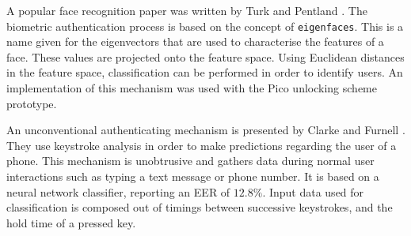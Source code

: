 A popular face recognition paper was written by Turk and Pentland \cite{turk1991face}. The biometric authentication process is based on the concept of {\tt eigenfaces}. This is a name given for the eigenvectors that are used to characterise the features of a face. These values are projected onto the feature space. Using Euclidean distances in the feature space, classification can be performed in order to identify users. An implementation of this mechanism was used with the Pico unlocking scheme prototype.

An unconventional authenticating mechanism is presented by Clarke and Furnell \cite{clarke2007authenticating}. They use keystroke analysis in order to make predictions regarding the user of a phone. This mechanism is unobtrusive and gathers data during normal user interactions such as typing a text message or phone number. It is based on a neural network classifier, reporting an EER of $12.8\%$. Input data used for classification is composed out of timings between successive keystrokes, and the hold time of a pressed key. 
